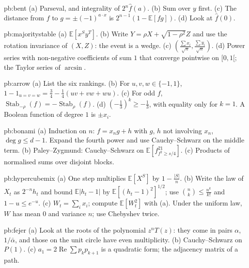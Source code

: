 \begin{hint}{pb:bent}
(a) Parseval, and integrality of $2^n\hat f(a)$. (b) Sum over $y$ first. (c) The distance from $f$ to $g=\pm(-1)^{a\cdot x}$ is
$2^{n-1}(1-\mathbb E[fg])$. (d) Look at $\hat f(0)$.
\end{hint}

\begin{hint}{pb:majoritystable}
(a) $\mathbb E[x^Sy^T]$. (b) Write $Y=\rho X+\sqrt{1-\rho^2}Z$ and use the rotation invariance of $(X,Z)$: the event is a wedge. (c) $(\frac{\sum x_i}{\sqrt n},\frac{\sum y_i}{\sqrt n})$.
(d) Power series with non-negative coefficients of sum $1$ that converge pointwise on $[0,1[$; the Taylor series of $\arcsin$.
\end{hint}

\begin{hint}{pb:arrow}
(a) List the six rankings. (b) For $u,v,w\in\{-1,1\}$, $1-1_{u=v=w}=\frac34-\frac14(uv+vw+wu)$. (c) For odd $f$, $\operatorname{Stab}_{-\rho}(f)=-\operatorname{Stab}_\rho(f)$.
(d) $(-\frac13)^k\ge-\frac13$, with equality only for $k=1$. A Boolean function of degree $1$ is $\pm x_i$.
\end{hint}

\begin{hint}{pb:bonami}
(a) Induction on $n$: $f=x_ng+h$ with $g$, $h$ not involving $x_n$, $\deg g\le d-1$. Expand the fourth power and use Cauchy--Schwarz on the
middle term. (b) Paley--Zygmund: Cauchy--Schwarz on $\mathbb E[f^21_{f^2\ge s/4}]$. (c) Products of normalised sums over disjoint blocks.
\end{hint}

\begin{hint}{pb:hypercubemix}
(a) One step multiplies $\mathbb E[X^S]$ by $1-\frac{|S|}n$. (b) Write the law of $X_t$ as $2^{-n}h_t$ and bound $\mathbb E|h_t-1|$ by $\mathbb E[(h_t-1)^2]^{1/2}$; use
$\binom nk\le\frac{n^k}{k!}$ and $1-u\le e^{-u}$. (c) $W_t=\sum_ix_i$; compute $\mathbb E[W_t^2]$ with (a). Under the uniform law, $W$ has mean $0$ and variance
$n$; use Chebyshev twice.
\end{hint}

\begin{hint}{pb:fejer}
(a) Look at the roots of the polynomial $z^nT(z)$: they come in pairs $\alpha$, $1/\bar\alpha$, and those on the unit circle have even
multiplicity. (b) Cauchy--Schwarz on $P(1)$. (c) $a_1=2\operatorname{Re}\sum p_kp_{k+1}$ is a quadratic form; the adjacency matrix of a path.
\end{hint}

